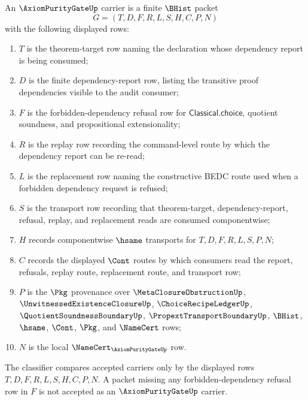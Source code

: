 \begin{definition}
\label{def:axiom-purity-gate-carrier}
An $\AxiomPurityGateUp$ carrier is a finite $\BHist$ packet
$$
G=(T,D,F,R,L,S,H,C,P,N)
$$
with the following displayed rows:
\begin{enumerate}
\item $T$ is the theorem-target row naming the declaration whose dependency report is being consumed;
\item $D$ is the finite dependency-report row, listing the transitive proof dependencies visible to the audit consumer;
\item $F$ is the forbidden-dependency refusal row for $\mathsf{Classical.choice}$, quotient soundness, and propositional extensionality;
\item $R$ is the replay row recording the command-level route by which the dependency report can be re-read;
\item $L$ is the replacement row naming the constructive BEDC route used when a forbidden dependency request is refused;
\item $S$ is the transport row recording that theorem-target, dependency-report, refusal, replay, and replacement reads are consumed componentwise;
\item $H$ records componentwise $\hsame$ transports for $T,D,F,R,L,S,P,N$;
\item $C$ records the displayed $\Cont$ routes by which consumers read the report, refusals, replay route, replacement route, and transport row;
\item $P$ is the $\Pkg$ provenance over $\MetaClosureObstructionUp$, $\UnwitnessedExistenceClosureUp$, $\ChoiceRecipeLedgerUp$, $\QuotientSoundnessBoundaryUp$, $\PropextTransportBoundaryUp$, $\BHist$, $\hsame$, $\Cont$, $\Pkg$, and $\NameCert$ rows;
\item $N$ is the local $\NameCert_{\AxiomPurityGateUp}$ row.
\end{enumerate}
The classifier compares accepted carriers only by the displayed rows $T,D,F,R,L,S,H,C,P,N$. A packet missing any forbidden-dependency refusal row in $F$ is not accepted as an $\AxiomPurityGateUp$ carrier.
\end{definition}

